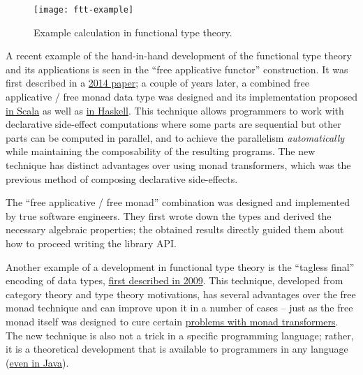 \begin{figure}
\begin{centering}
\texttt{[image: ftt-example]}
\par\end{centering}
\caption{Example calculation in functional type theory.}
\label{ftt-example}
\end{figure}

A recent example of the hand-in-hand development of the functional
type theory and its applications is seen in the ``free applicative
functor'' construction. It was first described in a \href{https://arxiv.org/pdf/1403.0749.pdf}{2014 paper};
a couple of years later, a combined free applicative / free monad
data type was designed and its implementation proposed \href{https://github.com/typelevel/cats/issues/983}{in Scala}
as well as \href{https://elvishjerricco.github.io/2016/04/08/applicative-effects-in-free-monads.html}{in Haskell}.
This technique allows programmers to work with declarative side-effect
computations where some parts are sequential but other parts can be
computed in parallel, and to achieve the parallelism \emph{automatically}
while maintaining the composability of the resulting programs. The
new technique has distinct advantages over using monad transformers,
which was the previous method of composing declarative side-effects.

The ``free applicative / free monad'' combination was designed and
implemented by true software engineers. They first wrote down the
types and derived the necessary algebraic properties; the obtained
results directly guided them about how to proceed writing the library
API.

Another example of a development in functional type theory is the
 ``tagless final'' encoding of data types, \href{http://okmij.org/ftp/tagless-final/index.html}{first described in 2009}.
This technique, developed from category theory and type theory motivations,
has several advantages over the free monad technique and can improve
upon it in a number of cases – just as the free monad itself was designed
to cure certain \href{http://blog.ezyang.com/2013/09/if-youre-using-lift-youre-doing-it-wrong-probably/}{problems with monad transformers}.
The new technique is also not a trick in a specific programming language;
rather, it is a theoretical development that is available to programmers
in any language (\href{https://oleksandrmanzyuk.wordpress.com/2014/06/18/from-object-algebras-to-finally-tagless-interpreters-2/}{even in Java}).


